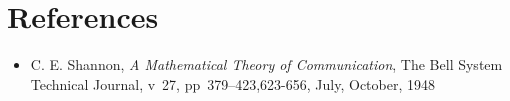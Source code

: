 
\section{References}
\label{sect-entropy-refs}

\begin{itemize}
%
\item C. E. Shannon, \textit{A Mathematical Theory of Communication},
The Bell System Technical Journal, v~27, pp~379--423,623-656, July, October,
1948
%
\end{itemize}

%
